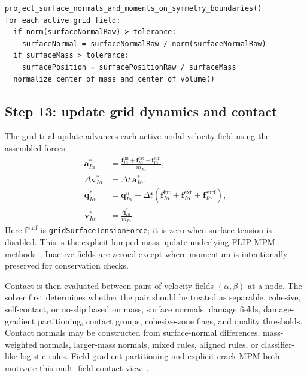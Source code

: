 \begin{lstlisting}[caption={Symmetry projection and normalization.},basicstyle=\ttfamily\small]
project_surface_normals_and_moments_on_symmetry_boundaries()
for each active grid field:
  if norm(surfaceNormalRaw) > tolerance:
    surfaceNormal = surfaceNormalRaw / norm(surfaceNormalRaw)
  if surfaceMass > tolerance:
    surfacePosition = surfacePositionRaw / surfaceMass
  normalize_center_of_mass_and_center_of_volume()
\end{lstlisting}

\subsection{Step 13: update grid dynamics and contact}
\label{subsec:solver-step-13}
The grid trial update advances each active nodal velocity field using the assembled forces:
\begin{align}
  \mathbf{a}_{I\alpha}^{\ast} &= \frac{\mathbf{f}^{\mathrm{int}}_{I\alpha}+\mathbf{f}^{\mathrm{ext}}_{I\alpha}+\mathbf{f}^{\mathrm{surf}}_{I\alpha}}{m_{I\alpha}}, \\
  \Delta\mathbf{v}_{I\alpha}^{\ast} &= \Delta t\,\mathbf{a}_{I\alpha}^{\ast}, \\
  \mathbf{q}_{I\alpha}^{\ast} &= \mathbf{q}_{I\alpha}^{n}+\Delta t\left(\mathbf{f}^{\mathrm{int}}_{I\alpha}+\mathbf{f}^{\mathrm{ext}}_{I\alpha}+\mathbf{f}^{\mathrm{surf}}_{I\alpha}\right), \\
  \mathbf{v}_{I\alpha}^{\ast} &= \frac{\mathbf{q}_{I\alpha}^{\ast}}{m_{I\alpha}}.
\end{align}
Here $\mathbf{f}^{\mathrm{surf}}$ is \texttt{gridSurfaceTensionForce}; it is zero when surface tension is disabled.  This is the explicit lumped-mass update underlying FLIP-MPM methods~\cite{sulsky1994history,wallstedt2008explicit}.  Inactive fields are zeroed except where momentum is intentionally preserved for conservation checks.

Contact is then evaluated between pairs of velocity fields $(\alpha,\beta)$ at a node.  The solver first determines whether the pair should be treated as separable, cohesive, self-contact, or no-slip based on mass, surface normals, damage fields, damage-gradient partitioning, contact groups, cohesive-zone flags, and quality thresholds.  Contact normals may be constructed from surface-normal differences, mass-weighted normals, larger-mass normals, mixed rules, aligned rules, or classifier-like logistic rules.  Field-gradient partitioning and explicit-crack MPM both motivate this multi-field contact view~\cite{nairn2003cramp,homel2016dfg}.

